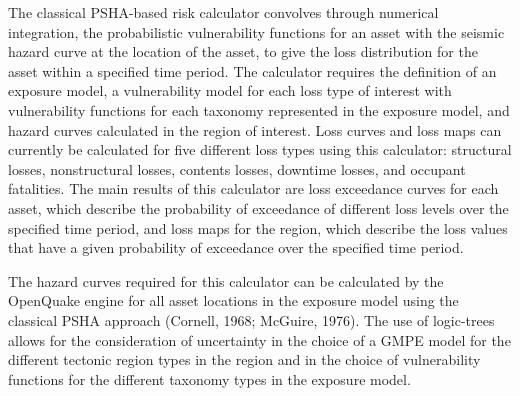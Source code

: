 The classical PSHA-based risk calculator convolves through numerical integration, the probabilistic vulnerability functions for an asset with the seismic hazard curve at the location of the asset, to give the loss distribution for the asset within a specified time period. The calculator requires the definition of an exposure model, a vulnerability model for each loss type of interest with vulnerability functions for each taxonomy represented in the exposure model, and hazard curves calculated in the region of interest. Loss curves and loss maps can currently be calculated for five different loss types using this calculator: structural losses, nonstructural losses, contents losses, downtime losses, and occupant fatalities. The main results of this calculator are loss exceedance curves for each asset, which describe the probability of exceedance of different loss levels over the specified time period, and loss maps for the region, which describe the loss values that have a given probability of exceedance over the specified time period.

The hazard curves required for this calculator can be calculated by the OpenQuake engine for all asset locations in the exposure model using the classical PSHA approach (Cornell, 1968; McGuire, 1976). The use of logic-trees allows for the consideration of uncertainty in the choice of a GMPE model for the different tectonic region types in the region and in the choice of vulnerability functions for the different taxonomy types in the exposure model.
